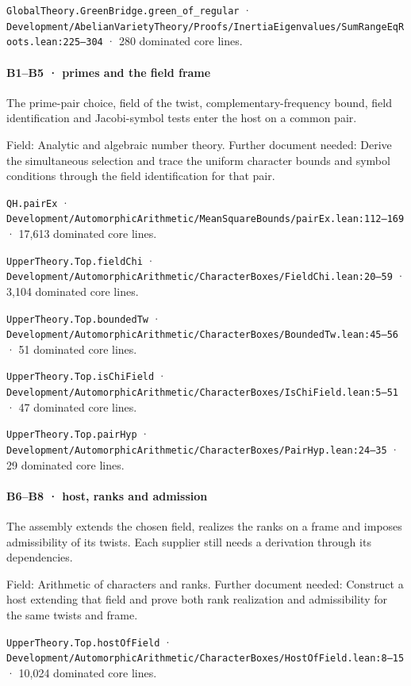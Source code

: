 \nolinkurl{GlobalTheory.GreenBridge.green_of_regular} · \nolinkurl{Development/AbelianVarietyTheory/Proofs/InertiaEigenvalues/SumRangeEqRoots.lean:225–304} · 280 dominated core lines.

\paragraph{B1–B5 · primes and the field frame}

The prime-pair choice, field of the twist, complementary-frequency bound, field identification and Jacobi-symbol tests enter the host on a common pair.

Field: Analytic and algebraic number theory. Further document needed: Derive the simultaneous selection and trace the uniform character bounds and symbol conditions through the field identification for that pair.

\nolinkurl{QH.pairEx} · \nolinkurl{Development/AutomorphicArithmetic/MeanSquareBounds/pairEx.lean:112–169} · 17,613 dominated core lines.

\nolinkurl{UpperTheory.Top.fieldChi} · \nolinkurl{Development/AutomorphicArithmetic/CharacterBoxes/FieldChi.lean:20–59} · 3,104 dominated core lines.

\nolinkurl{UpperTheory.Top.boundedTw} · \nolinkurl{Development/AutomorphicArithmetic/CharacterBoxes/BoundedTw.lean:45–56} · 51 dominated core lines.

\nolinkurl{UpperTheory.Top.isChiField} · \nolinkurl{Development/AutomorphicArithmetic/CharacterBoxes/IsChiField.lean:5–51} · 47 dominated core lines.

\nolinkurl{UpperTheory.Top.pairHyp} · \nolinkurl{Development/AutomorphicArithmetic/CharacterBoxes/PairHyp.lean:24–35} · 29 dominated core lines.

\paragraph{B6–B8 · host, ranks and admission}

The assembly extends the chosen field, realizes the ranks on a frame and imposes admissibility of its twists. Each supplier still needs a derivation through its dependencies.

Field: Arithmetic of characters and ranks. Further document needed: Construct a host extending that field and prove both rank realization and admissibility for the same twists and frame.

\nolinkurl{UpperTheory.Top.hostOfField} · \nolinkurl{Development/AutomorphicArithmetic/CharacterBoxes/HostOfField.lean:8–15} · 10,024 dominated core lines.

